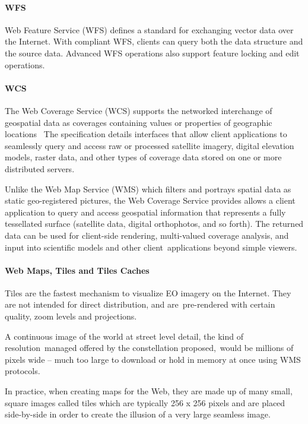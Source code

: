 \documentclass[a4paper]{article}
\begin{document}
\paragraph[WFS]{WFS}
Web Feature Service (WFS) defines a standard for exchanging vector data
over the Internet. With compliant WFS, clients can query both the data
structure and the source data. Advanced WFS operations also support
feature locking and edit operations.

\paragraph[WCS]{WCS}
The Web Coverage Service (WCS) supports the networked interchange of
geospatial data as {\textquotedbl}coverages{\textquotedbl} containing
values or properties of geographic locations \ The specification
details interfaces that allow client applications to seamlessly query
and access raw or processed satellite imagery, digital elevation
models, raster data, and other types of coverage data stored on one or
more distributed servers.

Unlike the Web Map Service (WMS) which filters and portrays spatial data
as static geo-registered {\textquotedbl}pictures{\textquotedbl}, the
Web Coverage Service provides allows a client application to query and
access geospatial information that represents a fully tessellated
surface (satellite data, digital orthophotos, and so forth). The
returned data can be used for client-side rendering, multi-valued
coverage analysis, and input into scientific models and other
client\ applications beyond simple viewers.

\paragraph[Web Maps, Tiles and Tiles Caches]{Web Maps, Tiles and Tiles
Caches}
Tiles are the fastest mechanism to visualize EO imagery on the Internet.
They are not intended for direct distribution, and are\ pre-rendered
with certain quality, zoom levels and projections.\ 

A continuous image of the world at street level detail, the kind of
resolution\ managed offered by the constellation proposed,\ would be
millions of pixels wide -- much too large to download or hold in memory
at once using WMS protocols.\ 

In practice, when creating maps for the Web, they are made up of many
small, square images called tiles which are typically 256 x 256 pixels
and are placed side-by-side in order to create the illusion of a very
large seamless image.\ 
\end{document}
